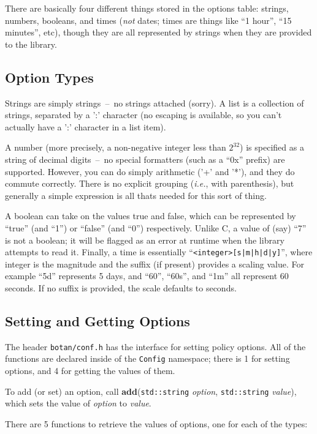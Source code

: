 \documentclass{article}
\newcommand{\filename}[1]{\texttt{#1}}
\newcommand{\function}[1]{\textbf{#1}}
\newcommand{\type}[1]{\texttt{#1}}
\renewcommand{\arg}[1]{\textsl{#1}}
\newcommand{\namespace}[1]{\texttt{#1}}
\newcommand{\ie}[0]{\emph{i.e.}}
\begin{document}
There are basically four different things stored in the options table: strings,
numbers, booleans, and times (\emph{not} dates; times are things like ``1
hour'', ``15 minutes'', etc), though they are all represented by strings when
they are provided to the library.

\subsection{Option Types}

Strings are simply strings~--~no strings attached (sorry). A list is a
collection of strings, separated by a ':' character (no escaping is available,
so you can't actually have a ':' character in a list item).

A number (more precisely, a non-negative integer less than $2^{32}$) is
specified as a string of decimal digits~--~no special formatters (such as a
``0x'' prefix) are supported. However, you can do simply arithmetic ('+' and
'*'), and they do commute correctly. There is no explicit grouping (\ie, with
parenthesis), but generally a simple expression is all thats needed for this
sort of thing.

A boolean can take on the values true and false, which can be represented by
``true'' (and ``1'') or ``false'' (and ``0'') respectively. Unlike C, a value
of (say) ``7'' is not a boolean; it will be flagged as an error at runtime when
the library attempts to read it. Finally, a time is essentially
``\texttt{<integer>[s|m|h|d|y]}'', where integer is the magnitude and the
suffix (if present) provides a scaling value. For example ``5d'' represents 5
days, and ``60'', ``60s'', and ``1m'' all represent 60 seconds. If no suffix is
provided, the scale defaults to seconds.

\subsection{Setting and Getting Options}

The header \filename{botan/conf.h} has the interface for setting policy
options. All of the functions are declared inside of the \namespace{Config}
namespace; there is 1 for setting options, and 4 for getting the values of
them.

To add (or set) an option, call \function{add}(\type{std::string} \arg{option},
\type{std::string} \arg{value}), which sets the value of \arg{option} to
\arg{value}.

There are 5 functions to retrieve the values of options, one for each of the
types:
\end{document}
